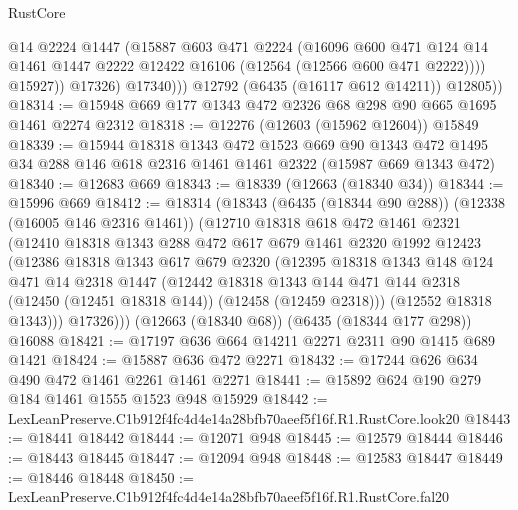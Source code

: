 \begin{lexlean}{RustCore}
\begin{coremodule}
                    @14
                    @2224
                    @1447
                    (@15887
                      @603
                      @471
                      @2224
                      (@16096
                        @600
                        @471
                        @124
                        @14
                        @1461
                        @1447
                        @2222
                        @12422
                        @16106
                        (@12564 (@12566 @600 @471 @2222))))
                    @15927))
                @17326)
              @17340)))
        @12792
        (@6435 (@16117 @612 @14211))
        @12805))
@18314 := @15948 @669 @177 @1343 @472 @2326 @68 @298 @90 @665 @1695 @1461 @2274 @2312
@18318 := @12276 (@12603 (@15962 @12604)) @15849
@18339 := @15944
    @18318
    @1343
    @472
    @1523
    @669
    @90
    @1343
    @472
    @1495
    @34
    @288
    @146
    @618
    @2316
    @1461
    @1461
    @2322
    (@15987 @669 @1343 @472)
@18340 := @12683 @669
@18343 := @18339 (@12663 (@18340 @34))
@18344 := @15996 @669
@18412 := @18314
    (@18343
      (@6435 (@18344 @90 @288))
      (@12338 (@16005 @146 @2316 @1461))
      (@12710
        @18318
        @618
        @472
        @1461
        @2321
        (@12410
          @18318
          @1343
          @288
          @472
          @617
          @679
          @1461
          @2320
          @1992
          @12423
          (@12386
            @18318
            @1343
            @617
            @679
            @2320
            (@12395
              @18318
              @1343
              @148
              @124
              @471
              @14
              @2318
              @1447
              (@12442
                @18318
                @1343
                @144
                @471
                @144
                @2318
                (@12450 (@12451 @18318 @144))
                (@12458 (@12459 @2318)))
              (@12552 @18318 @1343)))
          @17326)))
    (@12663 (@18340 @68))
    (@6435 (@18344 @177 @298))
    @16088
@18421 := @17197 @636 @664 @14211 @2271 @2311 @90 @1415 @689 @1421
@18424 := @15887 @636 @472 @2271
@18432 := @17244 @626 @634 @490 @472 @1461 @2261 @1461 @2271
@18441 := @15892 @624 @190 @279 @184 @1461 @1555 @1523 @948 @15929
@18442 := LexLeanPreserve.C1b912f4fc4d4e14a28bfb70aeef5f16f.R1.RustCore.look20
@18443 := @18441 @18442
@18444 := @12071 @948
@18445 := @12579 @18444
@18446 := @18443 @18445
@18447 := @12094 @948
@18448 := @12583 @18447
@18449 := @18446 @18448
@18450 := LexLeanPreserve.C1b912f4fc4d4e14a28bfb70aeef5f16f.R1.RustCore.fal20

\end{coremodule}
\end{lexlean}
